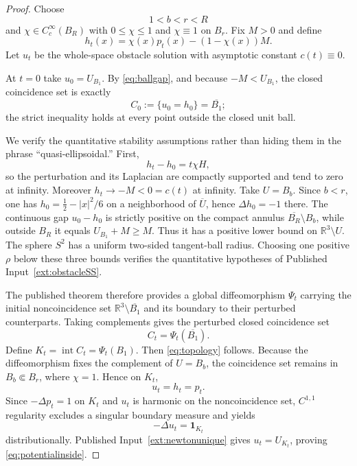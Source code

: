 \documentclass[11pt]{article}
\theoremstyle{definition}
\theoremstyle{remark}
\newcommand{\R}{\mathbb{R}}
\newcommand{\lap}{\Delta}
\newcommand{\1}{\mathbf{1}}
\begin{document}
\begin{proof}
Choose
\[
 1<b<r<R
\]
and $\chi\in C_c^\infty(B_R)$ with $0\le\chi\le1$ and $\chi\equiv1$ on $B_r$. Fix $M>0$ and define
\begin{equation}\label{eq:obstacle}
 h_t(x)=\chi(x)p_t(x)-(1-\chi(x))M.
\end{equation}
Let $u_t$ be the whole-space obstacle solution with asymptotic constant $c(t)\equiv0$.

At $t=0$ take $u_0=U_{B_1}$. By \eqref{eq:ballgap}, and because $-M<U_{B_1}$, the closed coincidence set is exactly
\begin{equation}\label{eq:contact}
 C_0:=\{u_0=h_0\}=\overline{B_1};
\end{equation}
the strict inequality holds at every point outside the closed unit ball.

We verify the quantitative stability assumptions rather than hiding them in the phrase ``quasi-ellipsoidal.'' First,
\[
 h_t-h_0=t\chi H,
\]
so the perturbation and its Laplacian are compactly supported and tend to zero at infinity. Moreover $h_t\to-M<0=c(t)$ at infinity. Take $U=B_b$. Since $b<r$, one has $h_0=\tfrac12-|x|^2/6$ on a neighborhood of $\overline U$, hence $\lap h_0=-1$ there. The continuous gap $u_0-h_0$ is strictly positive on the compact annulus $\overline{B_R}\setminus B_b$, while outside $B_R$ it equals $U_{B_1}+M\ge M$. Thus it has a positive lower bound on $\R^3\setminus U$. The sphere $S^2$ has a uniform two-sided tangent-ball radius. Choosing one positive $\rho$ below these three bounds verifies the quantitative hypotheses of Published Input~\ref{ext:obstacleSS}.

The published theorem therefore provides a global diffeomorphism $\Psi_t$ carrying the initial noncoincidence set $\R^3\setminus\overline{B_1}$ and its boundary to their perturbed counterparts. Taking complements gives the perturbed closed coincidence set
\[
 C_t=\Psi_t(\overline{B_1}).
\]
Define $K_t=\operatorname{int}C_t=\Psi_t(B_1)$. Then \eqref{eq:topology} follows. Because the diffeomorphism fixes the complement of $U=B_b$, the coincidence set remains in $B_b\Subset B_r$, where $\chi=1$. Hence on $K_t$,
\[
 u_t=h_t=p_t.
\]
Since $-\lap p_t=1$ on $K_t$ and $u_t$ is harmonic on the noncoincidence set, $C^{1,1}$ regularity excludes a singular boundary measure and yields
\[
 -\lap u_t=\1_{K_t}
\]
distributionally. Published Input~\ref{ext:newtonunique} gives $u_t=U_{K_t}$, proving \eqref{eq:potentialinside}.
\end{proof}
\end{document}
